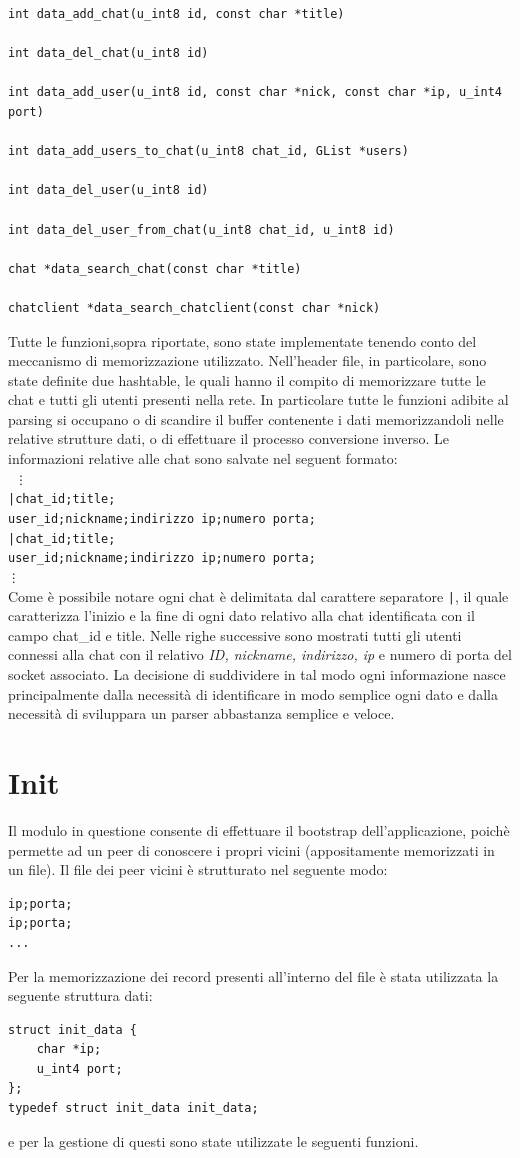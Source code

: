 \begin{lstlisting}
int data_add_chat(u_int8 id, const char *title)

int data_del_chat(u_int8 id)

int data_add_user(u_int8 id, const char *nick, const char *ip, u_int4 port)

int data_add_users_to_chat(u_int8 chat_id, GList *users)

int data_del_user(u_int8 id)

int data_del_user_from_chat(u_int8 chat_id, u_int8 id)

chat *data_search_chat(const char *title)

chatclient *data_search_chatclient(const char *nick)
\end{lstlisting}
Tutte le funzioni,sopra riportate, sono state implementate tenendo conto del meccanismo di memorizzazione utilizzato. Nell'header file, in particolare, sono state definite due hashtable, le quali hanno il compito di memorizzare tutte le chat e tutti gli utenti presenti nella rete. In particolare tutte le funzioni adibite al parsing si occupano o di scandire il buffer contenente i dati memorizzandoli nelle relative strutture dati, o di effettuare il processo conversione inverso. Le informazioni relative alle chat sono salvate nel seguent formato:\\
\texttt{
\vdots\\
		|chat\_id;title;\\
		user\_id;nickname;indirizzo ip;numero porta;\\
		|chat\_id;title;\\
		user\_id;nickname;indirizzo ip;numero porta;\\
\vdots\\
}
Come è possibile notare ogni chat è delimitata dal carattere separatore \texttt{|}, il quale caratterizza l'inizio e la fine di ogni dato relativo alla chat identificata con il campo chat\_id e title. Nelle righe successive sono mostrati tutti gli utenti connessi alla chat con il relativo \textit{ID, nickname, indirizzo, ip} e numero di porta del socket associato.
La decisione di suddividere in tal modo ogni informazione nasce principalmente dalla necessità di identificare in modo semplice ogni dato e dalla necessità di sviluppara un parser abbastanza semplice e veloce.  

\section{Init}
Il modulo in questione consente di effettuare il bootstrap dell'applicazione, poichè permette ad un peer di conoscere i propri vicini (appositamente memorizzati in un file). Il file dei peer vicini è strutturato nel seguente modo:
\begin{lstlisting}
ip;porta;
ip;porta;
...
\end{lstlisting}
Per la memorizzazione dei record presenti all'interno del file è stata utilizzata la seguente struttura dati:
\begin{lstlisting}
struct init_data {
	char *ip;
	u_int4 port;
};
typedef struct init_data init_data;
\end{lstlisting}
e per la gestione di questi sono state utilizzate le seguenti funzioni.

